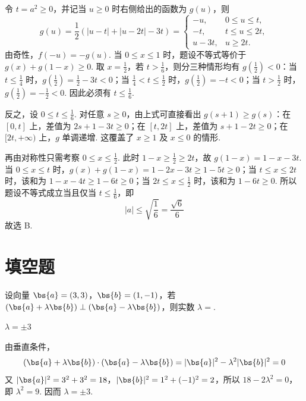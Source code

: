 \begin{solution}
令 \(t=a^2\geqslant0\)，并记当 \(u\geqslant0\) 时右侧给出的函数为 \(g(u)\)，则
\[
g(u)=\frac12\left(|u-t|+|u-2t|-3t\right)=
\begin{cases}
-u, & 0\leqslant u\leqslant t,\\
-t, & t\leqslant u\leqslant2t,\\
u-3t, & u\geqslant2t.
\end{cases}
\]
由奇性，\(f(-u)=-g(u)\). 当 \(0\leqslant x\leqslant1\) 时，题设不等式等价于 \(g(x)+g(1-x)\geqslant0\). 取 \(x=\frac12\)，若 \(t>\frac16\)，则分三种情形均有 \(g(\frac12)<0\)：当 \(t\leqslant\frac14\) 时，\(g(\frac12)=\frac12-3t<0\)；当 \(\frac14<t\leqslant\frac12\) 时，\(g(\frac12)=-t<0\)；当 \(t>\frac12\) 时，\(g(\frac12)=-\frac12<0\). 因此必须有 \(t\leqslant\frac16\).

反之，设 \(0\leqslant t\leqslant\frac16\). 对任意 \(s\geqslant0\)，由上式可直接看出 \(g(s+1)\geqslant g(s)\)：在 \([0,t]\) 上，差值为 \(2s+1-3t\geqslant0\)；在 \([t,2t]\) 上，差值为 \(s+1-2t\geqslant0\)；在 \([2t,+\infty)\) 上，\(g\) 单调递增. 这覆盖了 \(x\geqslant1\) 及 \(x\leqslant0\) 的情形.

再由对称性只需考察 \(0\leqslant x\leqslant\frac12\). 此时 \(1-x\geqslant\frac12\geqslant2t\)，故 \(g(1-x)=1-x-3t\). 当 \(0\leqslant x\leqslant t\) 时，\(g(x)+g(1-x)=1-2x-3t\geqslant1-5t\geqslant0\)；当 \(t\leqslant x\leqslant2t\) 时，该和为 \(1-x-4t\geqslant1-6t\geqslant0\)；当 \(2t\leqslant x\leqslant\frac12\) 时，该和为 \(1-6t\geqslant0\). 所以题设不等式成立当且仅当 \(t\leqslant\frac16\)，即
\[
|a|\leqslant\sqrt{\frac16}=\frac{\sqrt6}{6}
\]
故选 B.
\end{solution}

\section{填空题}

\begin{problem}
设向量 \(\bs{a} = (3, 3)\)，\(\bs{b} = (1, -1)\)，若 \((\bs{a} + \lambda \bs{b}) \perp (\bs{a} - \lambda \bs{b})\)，则实数 \(\lambda =\)\fillinblank{}.
\end{problem}

\begin{answer}
\(\lambda=\pm 3\)
\end{answer}

\begin{solution}
由垂直条件，
\[
(\bs{a}+\lambda\bs{b})\cdot(\bs{a}-\lambda\bs{b})
=|\bs{a}|^2-\lambda^2|\bs{b}|^2=0
\]
又 \(|\bs{a}|^2=3^2+3^2=18\)，\(|\bs{b}|^2=1^2+(-1)^2=2\)，所以 \(18-2\lambda^2=0\)，即 \(\lambda^2=9\). 因而 \(\lambda=\pm3\).
\end{solution}

